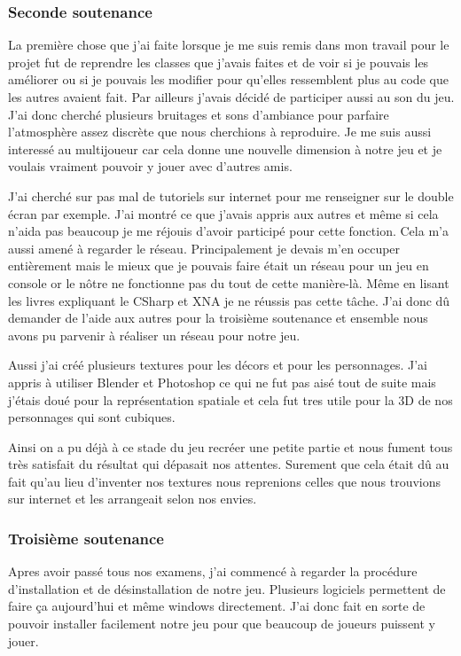 \documentclass[12pt]{article}
\begin{document}
\newpage
\subsubsection{Seconde soutenance}

La première chose que j’ai faite lorsque je me suis remis dans mon travail pour le projet fut de reprendre les classes que j’avais faites et de voir si je pouvais les améliorer ou si je pouvais les modifier pour qu’elles ressemblent plus au code que les autres avaient fait. Par ailleurs j’avais décidé de participer aussi au son du jeu. J’ai donc cherché plusieurs bruitages et sons d’ambiance pour parfaire l’atmosphère assez discrète que nous cherchions à reproduire. Je me suis aussi interessé au multijoueur car cela donne une nouvelle dimension à notre jeu et je voulais vraiment pouvoir y jouer avec d'autres amis.

J’ai cherché sur pas mal de tutoriels sur internet pour me renseigner sur le double écran par exemple. J’ai montré ce que j’avais appris aux autres et même si cela n’aida pas beaucoup je me réjouis d’avoir participé pour cette fonction. Cela m’a aussi amené à regarder le réseau. Principalement je devais m’en occuper entièrement mais le mieux que je pouvais faire était un réseau pour un jeu en console or le nôtre ne fonctionne pas du tout de cette manière-là. Même en lisant les livres expliquant le CSharp et XNA je ne réussis pas cette tâche. J’ai donc dû demander de l’aide aux autres pour la troisième soutenance et ensemble nous avons pu  parvenir à réaliser un réseau pour notre jeu.

Aussi j'ai créé plusieurs textures pour les décors et pour les personnages. J'ai appris à utiliser Blender et Photoshop ce qui ne fut pas aisé tout de suite mais j'étais doué pour la représentation spatiale et cela fut tres utile pour la 3D de nos personnages qui sont cubiques.

Ainsi on a pu déjà à ce stade du jeu recréer une petite partie et nous fument tous très satisfait du résultat qui dépasait nos attentes. Surement que cela était dû au fait qu'au lieu d'inventer nos textures nous reprenions celles que nous trouvions sur internet et les arrangeait selon nos envies.

\newpage
\subsubsection{Troisième soutenance} 

Apres avoir passé tous nos examens, j'ai commencé à regarder la procédure d'installation et de désinstallation de notre jeu. Plusieurs logiciels permettent de faire ça aujourd'hui et même windows directement. J'ai donc fait en sorte de pouvoir installer facilement notre jeu pour que beaucoup de joueurs puissent y jouer.
\end{document}
